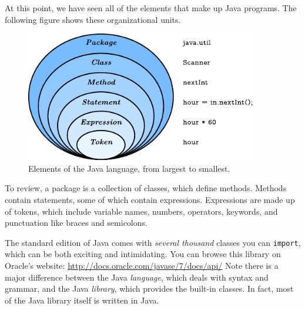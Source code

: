 \documentclass[12pt]{book}
\theoremstyle{exercise}
\newcommand{\java}[1]{\lstinline{#1}} %
\begin{document}
At this point, we have seen all of the elements that make up Java programs.
The following figure shows these organizational units.

\begin{figure}[!h]
\begin{center}
\includegraphics[width=4in]{figs/package.pdf}
\caption{Elements of the Java language, from largest to smallest.}
\end{center}
\end{figure}

To review, a package is a collection of classes, which define methods.
Methods contain statements, some of which contain expressions.
Expressions are made up of tokens, which include variable names, numbers, operators, keywords, and punctuation like braces and semicolons.

The standard edition of Java comes with {\em several thousand} classes you can \java{import}, which can be both exciting and intimidating.
You can browse this library on Oracle's website: \url{http://docs.oracle.com/javase/7/docs/api/}
Note there is a major difference between the Java {\em language}, which deals with syntax and grammar, and the Java {\em library}, which provides the built-in classes.
In fact, most of the Java library itself is written in Java.




\end{document}
